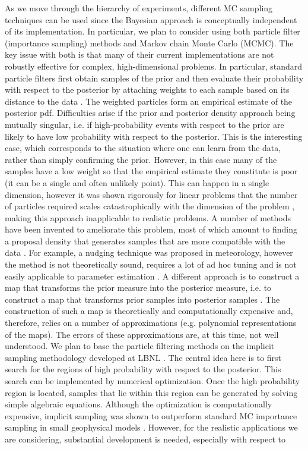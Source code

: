 \documentclass[11pt]{article}
\newcommand{\MarginPar}[1]{\marginpar{%
\vskip-\baselineskip %
\raggedright\tiny\sffamily
\hrule\smallskip{\color{red}#1}\par\smallskip\hrule}}
\begin{document}
As we move through the hierarchy of experiments, different MC sampling techniques can be used since the Bayesian approach is conceptually independent of its implementation. In particular, we plan to consider using both particle filter (importance sampling) methods and Markov chain Monte Carlo (MCMC).\MarginPar{Matti: started review for sampling} The key issue with both is that many  of their current implementations are not robustly effective for complex, high-dimensional problems. In particular, standard particle filters first obtain samples of the prior and then evaluate their probability with respect to the posterior by attaching weights to each sample based on its distance to the data \cite{Doucet2001,GordonSIR}. The weighted particles form an empirical estimate of the posterior pdf. Difficulties arise if the prior and posterior density approach being mutually singular, i.e. if high-probability events with respect to the prior are likely to have low probability with respect to the posterior. This is the interesting case, which corresponds to the situation where one can learn from the data, rather than simply confirming the prior. However, in this case many of the samples have a low weight so that the empirical estimate they constitute is poor (it can be a single and often unlikely point). This can happen in a single dimension, however it was shown rigorously for linear problems that the number of particles required scales catastrophically with the dimension of the problem \cite{Bickel,BickelBootstrap,Bickel2,Snyder,Weare2012,Weare2009}, making this approach inapplicable to realistic problems. A number of methods have been invented to ameliorate this problem, most of which amount to finding a proposal density that  generates samples that are more compatible with the data \cite{Doucet,OptimalImportanceFunction,liuchen1995,Brad}. For example, a nudging technique was proposed in meteorology, however the method is not theoretically sound, requires a lot of ad hoc tuning  and is not easily applicable to parameter estimation \cite{vanLeeuwen}. A different approach is to construct a map that transforms the prior measure into the posterior measure, i.e. to construct a map that transforms prior samples into posterior samples \cite{Moselhy2013}. The construction of such a map is theoretically and computationally expensive and, therefore, relies on a number of approximations (e.g. polynomial representations of the maps). The errors of these approximations are, at this time, not well understood. We plan to base the particle filtering methods on the implicit sampling methodology developed at LBNL \cite{chorintupnas,chorin2010,Morzfeld2011,Morzfeld2012,Atkins2013}. The central idea here is to first search for the regions of high probability with respect to the posterior. This search can be implemented by numerical optimization. Once the high probability region is located, samples that lie within this region can be generated by solving simple algebraic equations. Although the optimization is computationally expensive, implicit sampling was shown to outperform standard MC importance sampling in small geophysical models \cite{Morzfeld2011,Morzfeld2012,Atkins2013}.  However, for the realistic applications we are considering, substantial development is needed, especially with respect to 
\end{document}
